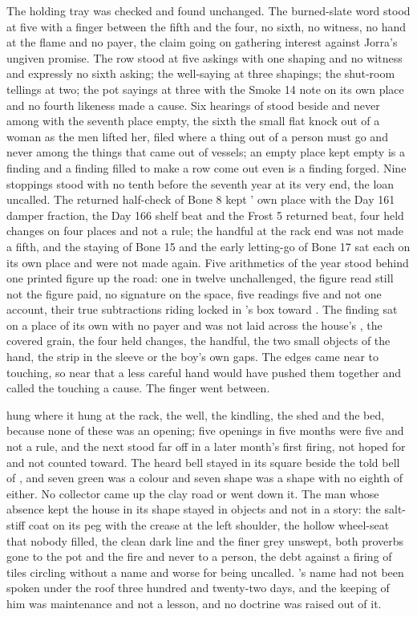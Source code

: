 The holding tray was checked and found unchanged. The burned-slate word stood at five with a finger between the fifth and the four, no sixth, no witness, no hand at the flame and no payer, the claim going on gathering interest against Jorra's ungiven promise. The row stood at five askings with one shaping and no witness and expressly no sixth asking; the well-saying at three shapings; the shut-room tellings at two; the pot sayings at three with the Smoke 14 note on its own place and no fourth likeness made a cause. Six hearings of  stood beside and never among with the seventh place empty, the sixth the small flat knock out of a woman as the men lifted her, filed where a thing out of a person must go and never among the things that came out of vessels; an empty place kept empty is a finding and a finding filled to make a row come out even is a finding forged. Nine stoppings stood with no tenth before the seventh year at its very end, the loan uncalled. The returned half-check of Bone 8 kept ' own place with the Day 161 damper fraction, the Day 166 shelf beat and the Frost 5 returned beat, four held changes on four places and not a rule; the handful at the rack end was not made a fifth, and the staying of Bone 15 and the early letting-go of Bone 17 sat each on its own place and were not made again. Five arithmetics of the year stood behind one printed figure up the road: one in twelve unchallenged, the figure read still not the figure paid, no signature on the space, five readings five and not one account, their true subtractions riding locked in 's box toward . The finding sat on a place of its own with no payer and was not laid across the house's , the covered grain, the four held changes, the handful, the two small objects of the hand, the strip in the sleeve or the boy's own gaps. The edges came near to touching, so near that a less careful hand would have pushed them together and called the touching a cause. The finger went between.

 hung where it hung at the rack, the well, the kindling, the shed and the bed, because none of these was an opening; five openings in five months were five and not a rule, and the next stood far off in a later month's first firing, not hoped for and not counted toward. The heard bell stayed in its square beside the told bell of , and seven green was a colour and seven shape was a shape with no eighth of either. No collector came up the clay road or went down it. The man whose absence kept the house in its shape stayed in objects and not in a story: the salt-stiff coat on its peg with the crease at the left shoulder, the hollow wheel-seat that nobody filled, the clean dark line and the finer grey unswept, both proverbs gone to the pot and the fire and never to a person, the debt against a firing of tiles circling without a name and worse for being uncalled. 's name had not been spoken under the roof three hundred and twenty-two days, and the keeping of him was maintenance and not a lesson, and no doctrine was raised out of it.

